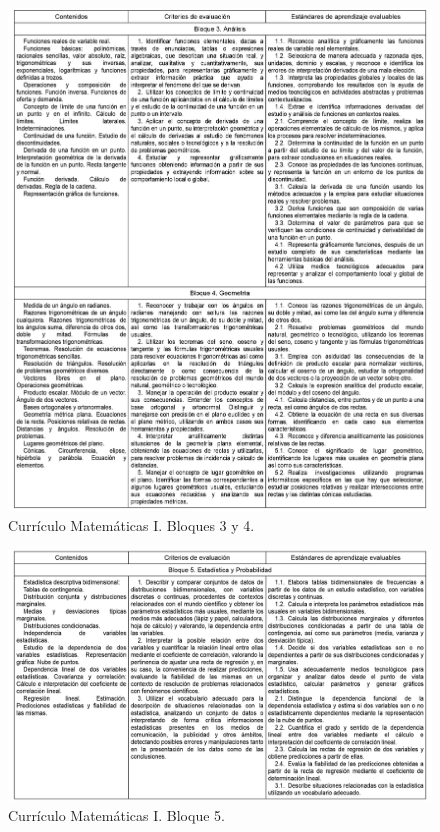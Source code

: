 \documentclass[a4paper, openright, 11pt, titlepage]{report}
\theoremstyle{definition}\newtheorem{defin}[propo]{Definition}
\theoremstyle{definition}\newtheorem{obser}[propo]{Remark}
\theoremstyle{definition}\newtheorem{ejem}[propo]{Ejemplo}
\theoremstyle{definition}\newtheorem{algoritmo}[propo]{Algoritmo}
\begin{document}
  \begin{figure}[H]
     \centering
     \includegraphics[width = 1.1\textwidth]{Images/Apéndices/Apéndice B/curriculo3.png}
     \caption{Currículo Matemáticas I. Bloques 3 y 4.}
 \end{figure}
  \begin{figure}[H]
     \centering
     \includegraphics[width = 1.1\textwidth]{Images/Apéndices/Apéndice B/curriculo4.png}
     \caption{Currículo Matemáticas I. Bloque 5.}
 \end{figure}
\end{document}
